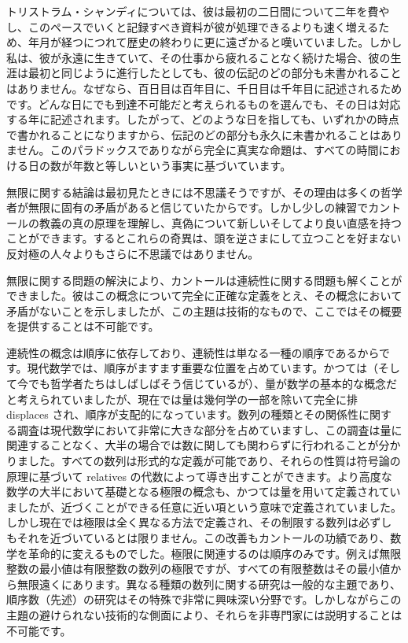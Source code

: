 \documentclass[a4paper,11pt,openany]{ltjsbook}
\begin{document}
トリストラム・シャンディについては、彼は最初の二日間について二年を費やし、このペースでいくと記録すべき資料が彼が処理できるよりも速く増えるため、年月が経つにつれて歴史の終わりに更に遠ざかると嘆いていました。しかし私は、彼が永遠に生きていて、その仕事から疲れることなく続けた場合、彼の生涯は最初と同じように進行したとしても、彼の伝記のどの部分も未書かれることはありません。なぜなら、百日目は百年目に、千日目は千年目に記述されるためです。どんな日にでも到達不可能だと考えられるものを選んでも、その日は対応する年に記述されます。したがって、どのような日を指しても、いずれかの時点で書かれることになりますから、伝記のどの部分も永久に未書かれることはありません。このパラドックスでありながら完全に真実な命題は、すべての時間における日の数が年数と等しいという事実に基づいています。

無限に関する結論は最初見たときには不思議そうですが、その理由は多くの哲学者が無限に固有の矛盾があると信じていたからです。しかし少しの練習でカントールの教義の真の原理を理解し、真偽について新しいそしてより良い直感を持つことができます。するとこれらの奇異は、頭を逆さまにして立つことを好まない反対極の人々よりもさらに不思議ではありません。

無限に関する問題の解決により、カントールは連続性に関する問題も解くことができました。彼はこの概念について完全に正確な定義をとえ、その概念において矛盾がないことを示しましたが、この主題は技術的なもので、ここではその概要を提供することは不可能です。


連続性の概念は順序に依存しており、連続性は単なる一種の順序であるからです。現代数学では、順序がますます重要な位置を占めています。かつては（そして今でも哲学者たちはしばしばそう信じているが）、量が数学の基本的な概念だと考えられていましたが、現在では量は幾何学の一部を除いて完全に排 displaces され、順序が支配的になっています。数列の種類とその関係性に関する調査は現代数学において非常に大きな部分を占めていますし、この調査は量に関連することなく、大半の場合では数に関しても関わらずに行われることが分かりました。すべての数列は形式的な定義が可能であり、それらの性質は符号論の原理に基づいて relatives の代数によって導き出すことができます。より高度な数学の大半において基礎となる極限の概念も、かつては量を用いて定義されていましたが、近づくことができる任意に近い項という意味で定義されていました。しかし現在では極限は全く異なる方法で定義され、その制限する数列は必ずしもそれを近づいているとは限りません。この改善もカントールの功績であり、数学を革命的に変えるものでした。極限に関連するのは順序のみです。例えば無限整数の最小値は有限整数の数列の極限ですが、すべての有限整数はその最小値から無限遠くにあります。異なる種類の数列に関する研究は一般的な主題であり、順序数（先述）の研究はその特殊で非常に興味深い分野です。しかしながらこの主題の避けられない技術的な側面により、それらを非専門家には説明することは不可能です。
\end{document}
